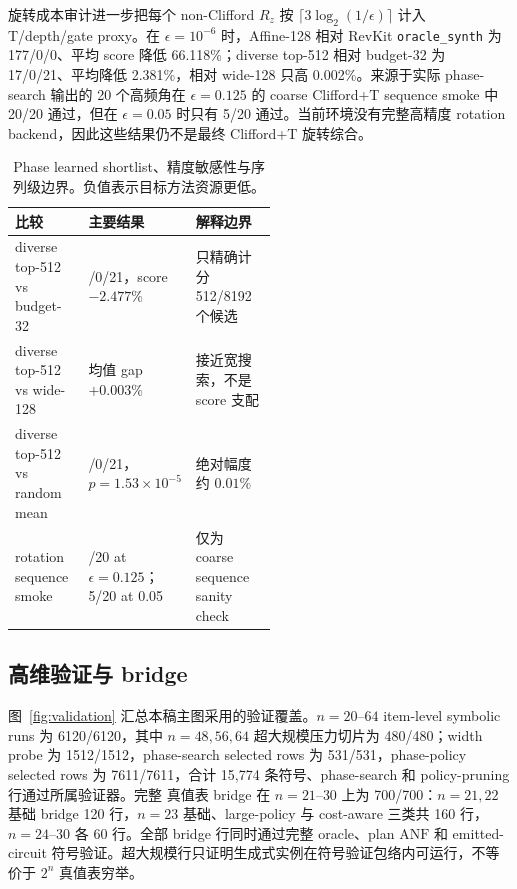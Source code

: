 \documentclass[UTF8,fontset=fandol,11pt]{ctexart}
\newcommand{\anf}{\ensuremath{\mathrm{ANF}}}
\newcommand{\rz}{\ensuremath{R_z}}
\newcommand{\ttable}{真值表}
\begin{document}
旋转成本审计进一步把每个 non-Clifford \rz{} 按 $\lceil3\log_2(1/\epsilon)\rceil$ 计入 T/depth/gate proxy。在 $\epsilon=10^{-6}$ 时，Affine-128 相对 RevKit \texttt{oracle\_synth} 为 177/0/0、平均 score 降低 66.118\%；diverse top-512 相对 budget-32 为 17/0/21、平均降低 2.381\%，相对 wide-128 只高 0.002\%。来源于实际 phase-search 输出的 20 个高频角在 $\epsilon=0.125$ 的 coarse Clifford+T sequence smoke 中 20/20 通过，但在 $\epsilon=0.05$ 时只有 5/20 通过。当前环境没有完整高精度 rotation backend，因此这些结果仍不是最终 Clifford+T 旋转综合。

\begin{table}[H]
\centering
\small
\setlength{\tabcolsep}{3pt}
\caption{Phase learned shortlist、精度敏感性与序列级边界。负值表示目标方法资源更低。}
\label{tab:phase-policy}
\begin{tabularx}{\linewidth}{>{\raggedright\arraybackslash}p{0.28\linewidth}>{\raggedright\arraybackslash}p{0.24\linewidth}>{\raggedright\arraybackslash}X}
\toprule
比较 & 主要结果 & 解释边界 \\
\midrule
diverse top-512 vs budget-32 & 17/0/21，score $-2.477\%$ & 只精确计分 512/8192 个候选 \\
diverse top-512 vs wide-128 & 均值 gap $+0.003\%$ & 接近宽搜索，不是 score 支配 \\
diverse top-512 vs random mean & 17/0/21，$p=1.53\times10^{-5}$ & 绝对幅度约 $0.01\%$ \\
rotation sequence smoke & 20/20 at $\epsilon=0.125$；5/20 at 0.05 & 仅为 coarse sequence sanity check \\
\bottomrule
\end{tabularx}
\end{table}

\subsection{高维验证与 bridge}

图~\ref{fig:validation} 汇总本稿主图采用的验证覆盖。$n=20$--$64$ item-level symbolic runs 为 6120/6120，其中 $n=48,56,64$ 超大规模压力切片为 480/480；width probe 为 1512/1512，phase-search selected rows 为 531/531，phase-policy selected rows 为 7611/7611，合计 15,774 条符号、phase-search 和 policy-pruning 行通过所属验证器。完整 \ttable{} bridge 在 $n=21$--$30$ 上为 700/700：$n=21,22$ 基础 bridge 120 行，$n=23$ 基础、large-policy 与 cost-aware 三类共 160 行，$n=24$--$30$ 各 60 行。全部 bridge 行同时通过完整 oracle、plan \anf{} 和 emitted-circuit 符号验证。超大规模行只证明生成式实例在符号验证包络内可运行，不等价于 $2^n$ 真值表穷举。
\end{document}
